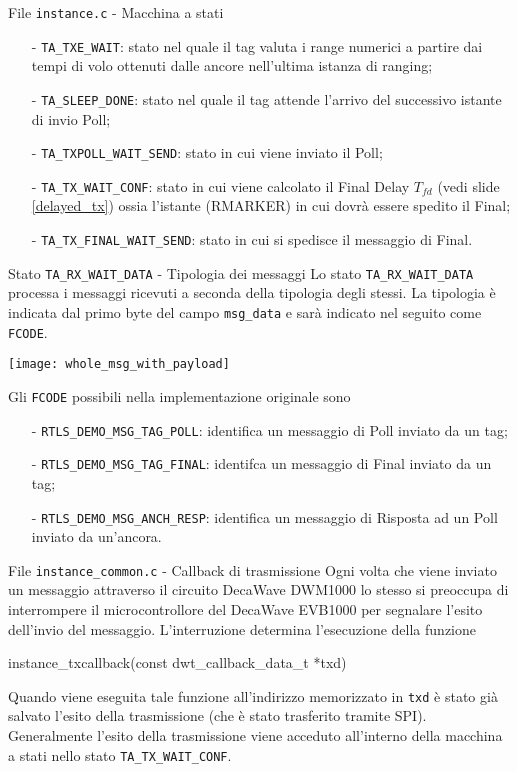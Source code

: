 \begin{frame}{File \lstinline!instance.c! - Macchina a stati}
  \begin{itemize}
  \item[-] \lstinline!TA_TXE_WAIT!: stato nel quale il tag valuta i range numerici a partire dai tempi di volo ottenuti dalle ancore nell'ultima istanza di ranging;
  \item[-] \lstinline!TA_SLEEP_DONE!: stato nel quale il tag attende l'arrivo del successivo istante di invio Poll;
  \item[-] \lstinline!TA_TXPOLL_WAIT_SEND!: stato in cui viene inviato il Poll;
  \item[-] \lstinline!TA_TX_WAIT_CONF!: stato in cui viene calcolato il Final Delay $T_{fd}$ (vedi slide \ref{delayed_tx})
    ossia l'istante (RMARKER) in cui dovrà essere spedito il Final;
  \item[-] \lstinline!TA_TX_FINAL_WAIT_SEND!: stato in cui si spedisce il messaggio di Final.
  \end{itemize}
\end{frame}

\begin{frame}[shrink=20]{Stato \lstinline!TA_RX_WAIT_DATA! - Tipologia dei messaggi}
  Lo stato \lstinline!TA_RX_WAIT_DATA! processa i messaggi ricevuti a seconda della tipologia degli stessi.
  La tipologia è indicata dal primo byte del campo \lstinline!msg_data! e sarà indicato nel seguito come \lstinline!FCODE!.
  \begin{center}
    \texttt{[image: whole\_msg\_with\_payload]}
  \end{center}
  Gli \lstinline!FCODE! possibili nella implementazione originale sono
  \begin{itemize}
  \item[-] \lstinline!RTLS_DEMO_MSG_TAG_POLL!: identifica un messaggio di Poll inviato da un tag;
  \item[-] \lstinline!RTLS_DEMO_MSG_TAG_FINAL!: identifca un messaggio di Final inviato da un tag;
  \item[-] \lstinline!RTLS_DEMO_MSG_ANCH_RESP!: identifica un messaggio di Risposta ad un Poll inviato da un'ancora.
  \end{itemize}
\end{frame}

\begin{frame}[fragile]{File \lstinline!instance_common.c! - Callback di trasmissione}
  Ogni volta che viene inviato un messaggio attraverso il circuito DecaWave DWM1000
  lo stesso si preoccupa di interrompere il microcontrollore del DecaWave EVB1000 per segnalare
  l'esito dell'invio del messaggio. L'interruzione determina l'esecuzione della funzione
  \begin{C}
    instance_txcallback(const dwt_callback_data_t *txd)
  \end{C}
  Quando viene eseguita tale funzione all'indirizzo memorizzato in \lstinline!txd! è stato già
  salvato l'esito della trasmissione (che è stato trasferito tramite SPI).\\
  Generalmente l'esito della trasmissione viene acceduto all'interno della macchina a stati
  nello stato \lstinline!TA_TX_WAIT_CONF!.
\end{frame}


